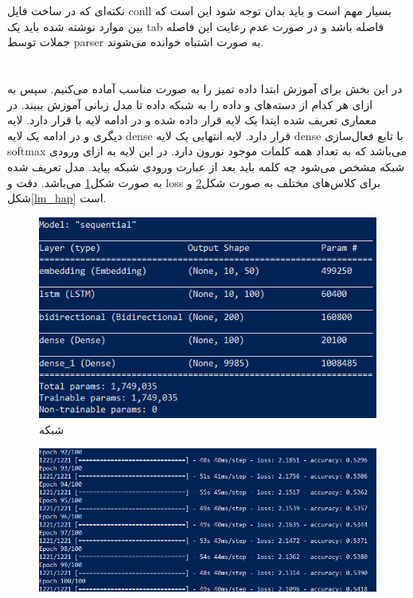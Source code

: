 \documentclass[10pt]{article}
\begin{document}
نکته‌‌ای که در ساخت فایل conll بسیار مهم است و باید بدان توجه شود این است که بین موارد نوشته شده باید یک tab فاصله باشد و در صورت عدم رعایت این فاصله جملات توسط parser به صورت اشتباه خوانده می‌شوند.
\newpage
\section{
	}
	در این بخش برای آموزش 
	ابتدا داده تمیز را به صورت مناسب آماده می‌کنیم. سپس به ازای هر کدام از دسته‌های 
	و
	داده را به شبکه داده تا مدل زبانی آموزش ببیند. در معماری تعریف شده ایتدا یک لایه 
	قرار داده شده و در ادامه لایه 
	با 
	قرار دارد. لایه دیگری
	و در ادامه یک لایه dense قرار دارد. لایه انتهایی یک لایه dense با تابع فعال‌سازی softmax می‌باشد که به تعداد همه کلمات موجود نورون دارد. در این لایه به ازای ورودی شبکه مشخص می‌شود چه کلمه باید بعد از عبارت ورودی شبکه بیاید.
	مدل تعریف شده به صورت شکل\ref{lm}
	می‌باشد. دقت و loss برای کلاس‌های مختلف به صورت شکل\ref{lm_dep} و شکل\ref{lm_hap} است. 

	
		\begin{figure}[ht!]
		\centering\includegraphics[width=0.8\linewidth]{../reports/lm_model.png}
		\caption{شبکه 
			}
		\label{lm}
	\end{figure}
	
	
	\begin{figure}[ht!]
		\centering\includegraphics[width=0.9\linewidth]{../reports/lm_dep.png}
		\caption{ 
			}
		\label{lm_dep}
	\end{figure}
\end{document}
